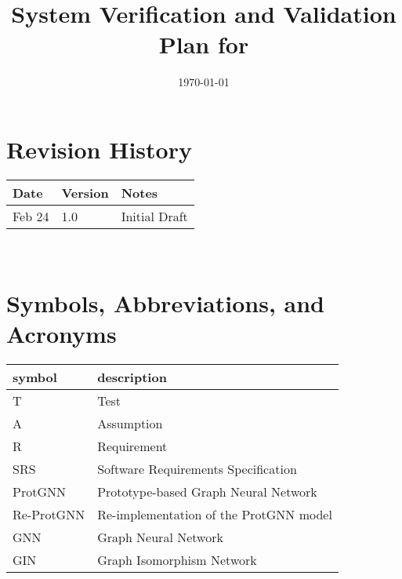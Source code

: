 \documentclass[12pt, titlepage]{article}
\begin{document}
\title{System Verification and Validation Plan for \progname{}} 
\author{\authname}
\date{\today}
	
\maketitle


\section*{Revision History}

\begin{tabularx}{\textwidth}{p{3cm}p{2cm}X}
\toprule {\bf Date} & {\bf Version} & {\bf Notes}\\
\midrule
Feb 24 & 1.0 & Initial Draft\\
\bottomrule
\end{tabularx}

~\\


\newpage

\tableofcontents

\listoftables


\newpage

\section{Symbols, Abbreviations, and Acronyms}

\renewcommand{\arraystretch}{1.2}
\begin{tabular}{l l} 
  \toprule		
  \textbf{symbol} & \textbf{description}\\
  \midrule 
  T & Test\\
  A & Assumption\\
  R & Requirement\\
  SRS & Software Requirements Specification\\
  ProtGNN & Prototype-based Graph Neural Network\\
  Re-ProtGNN & Re-implementation of the ProtGNN model\\
  GNN & Graph Neural Network\\
  GIN & Graph Isomorphism Network\\
  \bottomrule
\end{tabular}\\

\newpage
\end{document}
